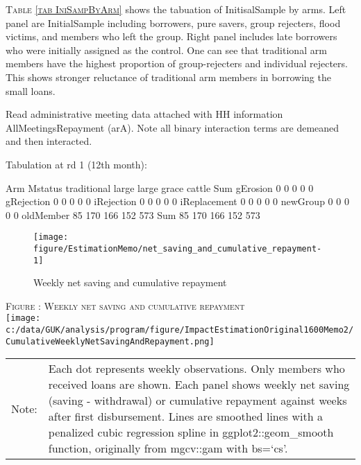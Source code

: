 \textsc{\normalsize Table \ref{tab IniSampByArm}} shows the tabuation of \textsf{InitisalSample} by arms. Left panel are \textsf{InitialSample} including borrowers, pure savers, group rejecters, flood victims, and members who left the group. Right panel includes late borrowers who were initially assigned as the control. One can see that \textsf{traditional} arm members have the highest proportion of group-rejecters and individual rejecters. This shows stronger reluctance of \textsf{traditional} arm members in borrowing the small loans. 


Read administrative meeting data attached with HH information \textsf{AllMeetingsRepayment} (\textsf{arA}). Note all binary interaction terms are demeaned and then interacted.


Tabulation at rd 1 (12th month):
\begin{Schunk}
\begin{Soutput}
              Arm
Mstatus        traditional large large grace cattle Sum
  gErosion               0     0           0      0   0
  gRejection             0     0           0      0   0
  iRejection             0     0           0      0   0
  iReplacement           0     0           0      0   0
  newGroup               0     0           0      0   0
  oldMember             85   170         166    152 573
  Sum                   85   170         166    152 573
\end{Soutput}
\end{Schunk}
\begin{Schunk}
\begin{figure}

{\centering \texttt{[image: figure/EstimationMemo/net\_saving\_and\_cumulative\_repayment-1]} 

}

\caption[Weekly net saving and cumulative repayment]{Weekly net saving and cumulative repayment}\label{Figure net saving and cumulative repayment}
\end{figure}
\end{Schunk}


\hfil\textsc{\footnotesize Figure \thefigure: Weekly net saving and cumulative repayment\label{fig weeklysavingrepay}}\\
\hfil\texttt{[image: c:/data/GUK/analysis/program/figure/ImpactEstimationOriginal1600Memo2/CumulativeWeeklyNetSavingAndRepayment.png]}\\
\renewcommand{\arraystretch}{1}
\hfil\begin{tabular}{>{\hfill\scriptsize}p{1cm}<{}>{\scriptsize}p{12cm}<{\hfill}}
Note:& Each dot represents weekly observations. Only members who received loans are shown. Each panel shows weekly net saving (saving - withdrawal) or cumulative repayment against weeks after first disbursement. Lines are smoothed lines with a penalized cubic regression spline in \textsf{ggplot2::geom\_smooth} function, originally from \textsf{mgcv::gam} with \textsf{bs=`cs'}. \\[-1ex]
\end{tabular}


